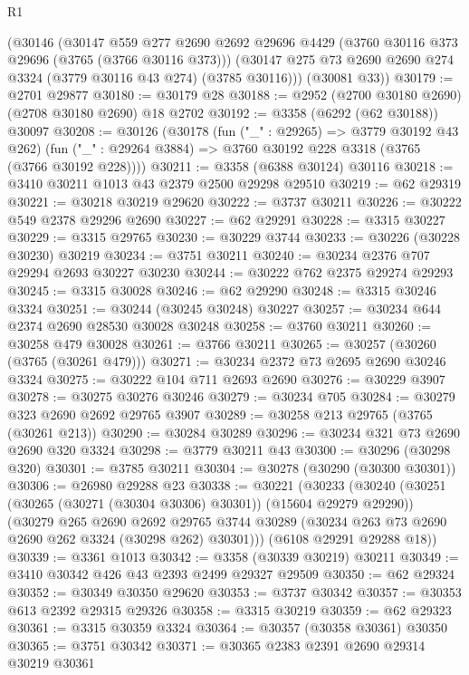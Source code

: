 \begin{lexlean}{R1}
\begin{coremodule}
    (@30146
      (@30147
        @559
        @277
        @2690
        @2692
        @29696
        @4429
        (@3760 @30116 @373 @29696 (@3765 (@3766 @30116 @373)))
        (@30147 @275 @73 @2690 @2690 @274 @3324 (@3779 @30116 @43 @274) (@3785 @30116)))
      (@30081 @33))
@30179 := @2701 @29877
@30180 := @30179 @28
@30188 := @2952 (@2700 @30180 @2690) (@2708 @30180 @2690) @18 @2702
@30192 := @3358 (@6292 (@62 @30188)) @30097
@30208 := @30126
    (@30178
      (fun ("_" : @29265) => @3779 @30192 @43 @262)
      (fun ("_" : @29264 @3884) => @3760 @30192 @228 @3318 (@3765 (@3766 @30192 @228))))
@30211 := @3358 (@6388 @30124) @30116
@30218 := @3410 @30211 @1013 @43 @2379 @2500 @29298 @29510
@30219 := @62 @29319
@30221 := @30218 @30219 @29620
@30222 := @3737 @30211
@30226 := @30222 @549 @2378 @29296 @2690
@30227 := @62 @29291
@30228 := @3315 @30227
@30229 := @3315 @29765
@30230 := @30229 @3744
@30233 := @30226 (@30228 @30230) @30219
@30234 := @3751 @30211
@30240 := @30234 @2376 @707 @29294 @2693 @30227 @30230
@30244 := @30222 @762 @2375 @29274 @29293
@30245 := @3315 @30028
@30246 := @62 @29290
@30248 := @3315 @30246 @3324
@30251 := @30244 (@30245 @30248) @30227
@30257 := @30234 @644 @2374 @2690 @28530 @30028 @30248
@30258 := @3760 @30211
@30260 := @30258 @479 @30028
@30261 := @3766 @30211
@30265 := @30257 (@30260 (@3765 (@30261 @479)))
@30271 := @30234 @2372 @73 @2695 @2690 @30246 @3324
@30275 := @30222 @104 @711 @2693 @2690
@30276 := @30229 @3907
@30278 := @30275 @30276 @30246
@30279 := @30234 @705
@30284 := @30279 @323 @2690 @2692 @29765 @3907
@30289 := @30258 @213 @29765 (@3765 (@30261 @213))
@30290 := @30284 @30289
@30296 := @30234 @321 @73 @2690 @2690 @320 @3324
@30298 := @3779 @30211 @43
@30300 := @30296 (@30298 @320)
@30301 := @3785 @30211
@30304 := @30278 (@30290 (@30300 @30301))
@30306 := @26980 @29288 @23
@30338 := @30221
    (@30233
      (@30240
        (@30251 (@30265 (@30271 (@30304 @30306) @30301)) (@15604 @29279 @29290))
        (@30279
          @265
          @2690
          @2692
          @29765
          @3744
          @30289
          (@30234 @263 @73 @2690 @2690 @262 @3324 (@30298 @262) @30301)))
      (@6108 @29291 @29288 @18))
@30339 := @3361 @1013
@30342 := @3358 (@30339 @30219) @30211
@30349 := @3410 @30342 @426 @43 @2393 @2499 @29327 @29509
@30350 := @62 @29324
@30352 := @30349 @30350 @29620
@30353 := @3737 @30342
@30357 := @30353 @613 @2392 @29315 @29326
@30358 := @3315 @30219
@30359 := @62 @29323
@30361 := @3315 @30359 @3324
@30364 := @30357 (@30358 @30361) @30350
@30365 := @3751 @30342
@30371 := @30365 @2383 @2391 @2690 @29314 @30219 @30361

\end{coremodule}
\end{lexlean}
